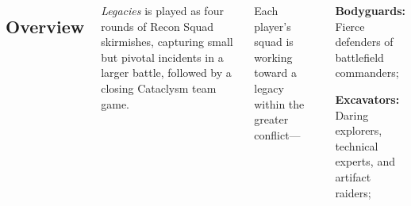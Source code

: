 \begin{columns}
\columnbreak
\noindent{}
  
\subsection{Overview}

\emph{Legacies} is played as four rounds of Recon Squad skirmishes,
capturing small but pivotal incidents in a larger battle, followed by
a closing Cataclysm team game.

Each player's squad is working toward a legacy within the
greater conflict---

\begin{squishitemize}
\item \textbf{Bodyguards:} Fierce defenders of battlefield
  commanders;

\item \textbf{Excavators:} Daring explorers, technical experts, and
  artifact raiders;


\end{squishitemize}
\end{columns}
